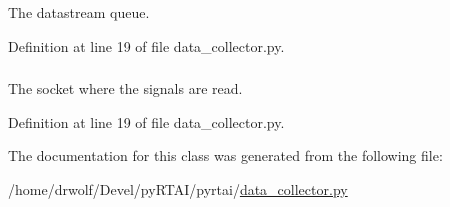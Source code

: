 \-The datastream queue. 



\-Definition at line 19 of file data\-\_\-collector.\-py.

\hypertarget{classpyrtai_1_1data__collector_1_1_data_collector_ab597fdd068366adc163f381b44524235}{
\subsubsection[{socket}]{}}
\label{classpyrtai_1_1data__collector_1_1_data_collector_ab597fdd068366adc163f381b44524235}


\-The socket where the signals are read. 



\-Definition at line 19 of file data\-\_\-collector.\-py.



\-The documentation for this class was generated from the following file\-:\begin{DoxyCompactItemize}
\item 
/home/drwolf/\-Devel/py\-R\-T\-A\-I/pyrtai/\hyperlink{data__collector_8py}{data\-\_\-collector.\-py}\end{DoxyCompactItemize}

